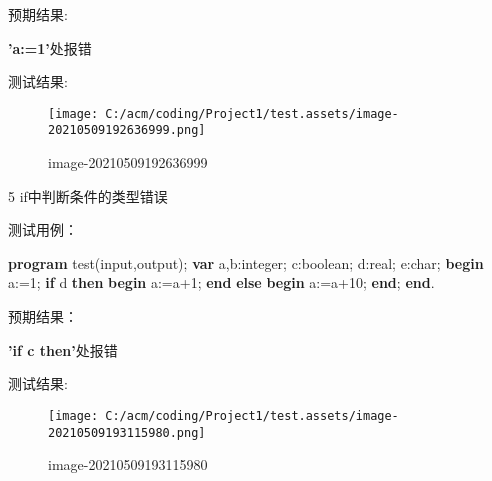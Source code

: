 \documentclass[]{ctexart}
\newenvironment{Shaded}{}{}
\newcommand{\DataTypeTok}[1]{\textcolor[rgb]{0.56,0.13,0.00}{#1}}
\newcommand{\DecValTok}[1]{\textcolor[rgb]{0.25,0.63,0.44}{#1}}
\newcommand{\KeywordTok}[1]{\textcolor[rgb]{0.00,0.44,0.13}{\textbf{#1}}}
\newcommand{\NormalTok}[1]{#1}
\begin{document}
预期结果:

\textbf{'a:=1'}处报错

测试结果:

\begin{figure}
\centering
\texttt{[image: C:/acm/coding/Project1/test.assets/image-20210509192636999.png]}
\caption{image-20210509192636999}
\end{figure}

5 if中判断条件的类型错误

测试用例：

\begin{Shaded}
\begin{Highlighting}[]
\KeywordTok{program}\NormalTok{ test(input,output);}
\KeywordTok{var}\NormalTok{ a,b:}\DataTypeTok{integer}\NormalTok{;  }
\NormalTok{    c:}\DataTypeTok{boolean}\NormalTok{;  }
\NormalTok{    d:}\DataTypeTok{real}\NormalTok{;  }
\NormalTok{    e:}\DataTypeTok{char}\NormalTok{;  }
\KeywordTok{begin}  
\NormalTok{    a:=}\DecValTok{1}\NormalTok{;   }
    \KeywordTok{if}\NormalTok{ d }\KeywordTok{then}  
        \KeywordTok{begin}  
\NormalTok{            a:=a+}\DecValTok{1}\NormalTok{;  }
        \KeywordTok{end}  
    \KeywordTok{else}  
        \KeywordTok{begin}  
\NormalTok{            a:=a+}\DecValTok{10}\NormalTok{;    }
        \KeywordTok{end}\NormalTok{;}
\KeywordTok{end}\NormalTok{. }
\end{Highlighting}
\end{Shaded}

预期结果：

\textbf{'if c then'}处报错

测试结果:

\begin{figure}
\centering
\texttt{[image: C:/acm/coding/Project1/test.assets/image-20210509193115980.png]}
\caption{image-20210509193115980}
\end{figure}
\end{document}
